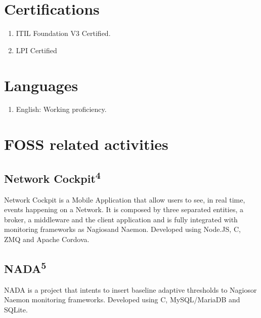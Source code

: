 \documentclass{article}
\begin{document}
\begin{multicols}{2}
\section{Certifications}
\begin{enumerate}
\item ITIL Foundation V3 Certified.
\item LPI Certified
\end{enumerate}

\section{Languages}
\begin{enumerate}
\item English: Working proficiency.
\end{enumerate}

\section{FOSS related activities}

\subsection{Network Cockpit\textsuperscript{4}}
Network Cockpit is a Mobile Application that allow users to see, in real time,
events happening on a Network. It is composed by three separated entities, a
broker, a middleware and the client application and is fully integrated with
monitoring frameworks as Nagios\texttrademark and Naemon. Developed using
Node.JS, C, ZMQ and Apache Cordova.

\subsection{NADA\textsuperscript{5}}
NADA is a project that intents to insert baseline adaptive thresholds to 
Nagios\texttrademark or Naemon monitoring frameworks. Developed using C,
MySQL/MariaDB and SQLite.


\end{multicols}
\end{document}
